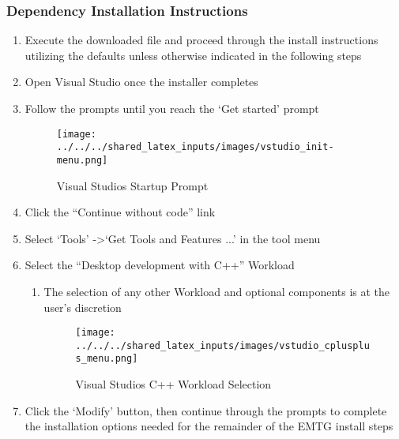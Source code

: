\subsubsection{Dependency Installation Instructions}
\begin{enumerate}
	\item Execute the downloaded file and proceed through the install instructions utilizing the defaults unless otherwise indicated in the following steps
	\item Open Visual Studio once the installer completes
	\item Follow the prompts until you reach the ‘Get started’ prompt 
		\begin{figure}[H]
			\centering
			\texttt{[image: ../../../shared\_latex\_inputs/images/vstudio\_init-menu.png]}
			\caption{Visual Studios Startup Prompt}
		\end{figure}
	\item Click the “Continue without code” link
	\item Select ‘Tools’ -\textgreater  ‘Get Tools and Features ...’ in the tool menu
	\item Select the “Desktop development with C++” Workload
	\begin{enumerate}
		\item The selection of any other Workload and optional components is at the user's discretion
			\begin{figure}[H]
				\centering
				\texttt{[image: ../../../shared\_latex\_inputs/images/vstudio\_cplusplus\_menu.png]}
				\caption{Visual Studios C++ Workload Selection}
			\end{figure}
	\end{enumerate}	
	\item Click the ‘Modify’ button, then continue through the prompts to complete the installation options needed for the remainder of the EMTG install steps
\end{enumerate}

